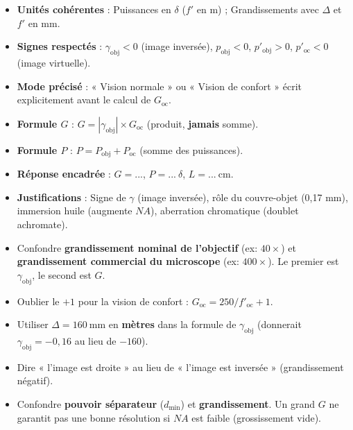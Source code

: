 \documentclass[11pt]{article}
\begin{document}
\begin{aretenir}
\begin{itemize}
    \item[$\square$] \textbf{Unités cohérentes} : Puissances en $\delta$ ($f'$ en m) ; Grandissements avec $\Delta$ et $f'$ en mm.
    \item[$\square$] \textbf{Signes respectés} : $\gamma_{\text{obj}} < 0$ (image inversée), $p_{\text{obj}} < 0$, $p'_{\text{obj}} > 0$, $p'_{\text{oc}} < 0$ (image virtuelle).
    \item[$\square$] \textbf{Mode précisé} : « Vision normale » ou « Vision de confort » écrit explicitement avant le calcul de $G_{\text{oc}}$.
    \item[$\square$] \textbf{Formule $G$} : $G = |\gamma_{\text{obj}}| \times G_{\text{oc}}$ (produit, \textbf{jamais} somme).
    \item[$\square$] \textbf{Formule $P$} : $P = P_{\text{obj}} + P_{\text{oc}}$ (somme des puissances).
    \item[$\square$] \textbf{Réponse encadrée} : $\boxed{G = ...}$, $\boxed{P = ...\ \delta}$, $\boxed{L = ...\ \text{cm}}$.
    \item[$\square$] \textbf{Justifications} : Signe de $\gamma$ (image inversée), rôle du couvre-objet (0,17 mm), immersion huile (augmente $NA$), aberration chromatique (doublet achromate).
\end{itemize}
\end{aretenir}

\begin{attention}
\begin{itemize}
    \item Confondre \textbf{grandissement nominal de l'objectif} (ex: $40\times$) et \textbf{grandissement commercial du microscope} (ex: $400\times$). Le premier est $\gamma_{\text{obj}}$, le second est $G$.
    \item Oublier le \textbf{$+1$} pour la vision de confort : $G_{\text{oc}} = 250/f'_{\text{oc}} + 1$.
    \item Utiliser $\Delta = 160\ \text{mm}$ en \textbf{mètres} dans la formule de $\gamma_{\text{obj}}$ (donnerait $\gamma_{\text{obj}} = -0,16$ au lieu de $-160$).
    \item Dire « l'image est droite » au lieu de « l'image est inversée » (grandissement négatif).
    \item Confondre \textbf{pouvoir séparateur} ($d_{\text{min}}$) et \textbf{grandissement}. Un grand $G$ ne garantit pas une bonne résolution si $NA$ est faible (grossissement vide).
\end{itemize}
\end{attention}
\end{document}
